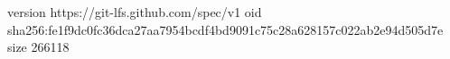 version https://git-lfs.github.com/spec/v1
oid sha256:fe1f9dc0fc36dca27aa7954bcdf4bd9091c75c28a628157c022ab2e94d505d7e
size 266118
